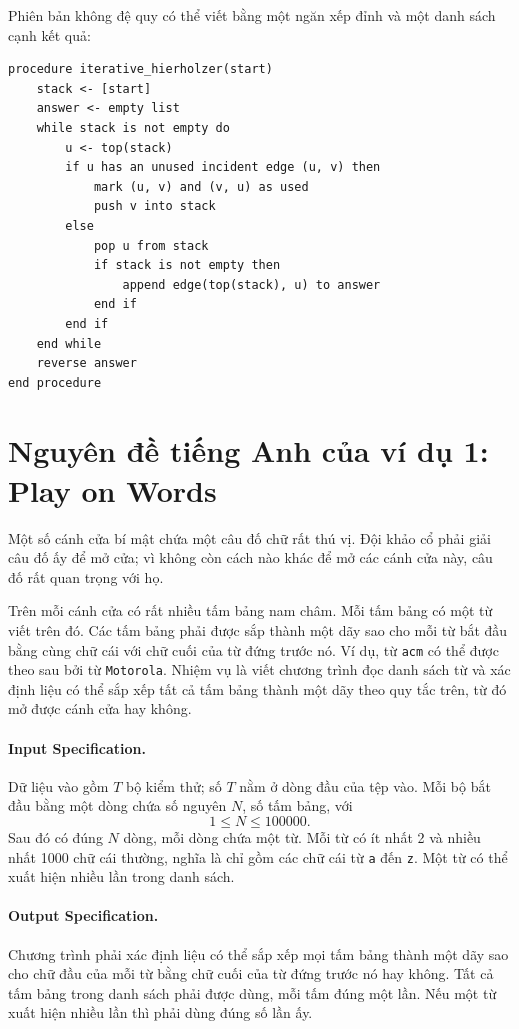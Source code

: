 \documentclass[11pt]{article}
\begin{document}
Phiên bản không đệ quy có thể viết bằng một ngăn xếp đỉnh và một danh sách
cạnh kết quả:
\begin{verbatim}
procedure iterative_hierholzer(start)
    stack <- [start]
    answer <- empty list
    while stack is not empty do
        u <- top(stack)
        if u has an unused incident edge (u, v) then
            mark (u, v) and (v, u) as used
            push v into stack
        else
            pop u from stack
            if stack is not empty then
                append edge(top(stack), u) to answer
            end if
        end if
    end while
    reverse answer
end procedure
\end{verbatim}

\section{Nguyên đề tiếng Anh của ví dụ 1: Play on Words}

Một số cánh cửa bí mật chứa một câu đố chữ rất thú vị. Đội khảo cổ phải giải
câu đố ấy để mở cửa; vì không còn cách nào khác để mở các cánh cửa này, câu đố
rất quan trọng với họ.

Trên mỗi cánh cửa có rất nhiều tấm bảng nam châm. Mỗi tấm bảng có một từ viết
trên đó. Các tấm bảng phải được sắp thành một dãy sao cho mỗi từ bắt đầu bằng
cùng chữ cái với chữ cuối của từ đứng trước nó. Ví dụ, từ \texttt{acm} có thể
được theo sau bởi từ \texttt{Motorola}. Nhiệm vụ là viết chương trình đọc danh
sách từ và xác định liệu có thể sắp xếp tất cả tấm bảng thành một dãy theo quy
tắc trên, từ đó mở được cánh cửa hay không.

\paragraph{Input Specification.}
Dữ liệu vào gồm \(T\) bộ kiểm thử; số \(T\) nằm ở dòng đầu của tệp vào. Mỗi bộ
bắt đầu bằng một dòng chứa số nguyên \(N\), số tấm bảng, với
\[
  1\le N\le 100000.
\]
Sau đó có đúng \(N\) dòng, mỗi dòng chứa một từ. Mỗi từ có ít nhất 2 và nhiều
nhất 1000 chữ cái thường, nghĩa là chỉ gồm các chữ cái từ \texttt{a} đến
\texttt{z}. Một từ có thể xuất hiện nhiều lần trong danh sách.

\paragraph{Output Specification.}
Chương trình phải xác định liệu có thể sắp xếp mọi tấm bảng thành một dãy sao
cho chữ đầu của mỗi từ bằng chữ cuối của từ đứng trước nó hay không. Tất cả tấm
bảng trong danh sách phải được dùng, mỗi tấm đúng một lần. Nếu một từ xuất hiện
nhiều lần thì phải dùng đúng số lần ấy.
\end{document}
